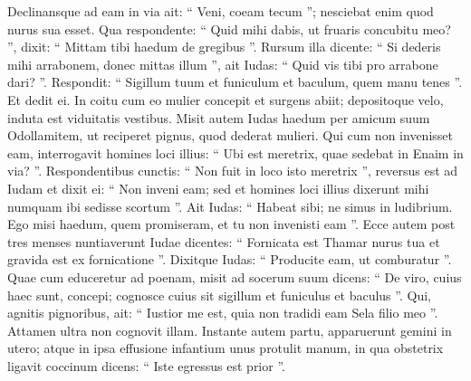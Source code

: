 \begin{biblechapter}
\begin{biblechapter}
\begin{biblechapter}
\begin{biblechapter}
\begin{biblechapter}
\begin{biblechapter}
\begin{biblechapter}
\begin{biblechapter}
\begin{biblechapter}
\begin{biblechapter}
\begin{biblechapter}
\begin{biblechapter}
\begin{biblechapter}
\begin{biblechapter}
\begin{biblechapter}
\begin{biblechapter}
\begin{biblechapter}
\begin{biblechapter}
\begin{biblechapter}
\begin{biblechapter}
\begin{biblechapter}
\begin{biblechapter}
\begin{biblechapter}
\begin{biblechapter}
\begin{biblechapter}
\begin{biblechapter}
\begin{biblechapter}
\begin{biblechapter}
\begin{biblechapter}
\begin{biblechapter}
\begin{biblechapter}
\begin{biblechapter}
\begin{biblechapter}
\begin{biblechapter}
\begin{biblechapter}
\begin{biblechapter}
\begin{biblechapter}
\begin{biblechapter}
\verse Declinansque ad eam in via ait: “ Veni, coeam tecum ”; nesciebat enim quod nurus sua esset. Qua respondente: “ Quid mihi dabis, ut fruaris concubitu meo? ”, 
\verse dixit: “ Mittam tibi haedum de gregibus ”. Rursum illa dicente: “ Si dederis mihi arrabonem, donec mittas illum ”, 
\verse ait Iudas: “ Quid vis tibi pro arrabone dari? ”. Respondit: “ Sigillum tuum et funiculum et baculum, quem manu tenes ”. Et dedit ei. In coitu cum eo mulier concepit 
\verse et surgens abiit; depositoque velo, induta est viduitatis vestibus.
 \verse Misit autem Iudas haedum per amicum suum Odollamitem, ut reciperet pignus, quod dederat mulieri. Qui cum non invenisset eam, 
\verse interrogavit homines loci illius: “ Ubi est meretrix, quae sedebat in Enaim in via? ”. Respondentibus cunctis: “ Non fuit in loco isto meretrix ”, 
\verse reversus est ad Iudam et dixit ei: “ Non inveni eam; sed et homines loci illius dixerunt mihi numquam ibi sedisse scortum ”. 
\verse Ait Iudas: “ Habeat sibi; ne simus in ludibrium. Ego misi haedum, quem promiseram, et tu non invenisti eam ”.
 \verse Ecce autem post tres menses nuntiaverunt Iudae dicentes: “ Fornicata est Thamar nurus tua et gravida est ex fornicatione ”. Dixitque Iudas: “ Producite eam, ut comburatur ”. 
\verse Quae cum educeretur ad poenam, misit ad socerum suum dicens: “ De viro, cuius haec sunt, concepi; cognosce cuius sit sigillum et funiculus et baculus ”. 
\verse Qui, agnitis pignoribus, ait: “ Iustior me est, quia non tradidi eam Sela filio meo ”. Attamen ultra non cognovit illam.
 \verse Instante autem partu, apparuerunt gemini in utero; atque in ipsa effusione infantium unus protulit manum, in qua obstetrix ligavit coccinum dicens: 
\verse “ Iste egressus est prior ”. 

\end{biblechapter}
\end{biblechapter}
\end{biblechapter}
\end{biblechapter}
\end{biblechapter}
\end{biblechapter}
\end{biblechapter}
\end{biblechapter}
\end{biblechapter}
\end{biblechapter}
\end{biblechapter}
\end{biblechapter}
\end{biblechapter}
\end{biblechapter}
\end{biblechapter}
\end{biblechapter}
\end{biblechapter}
\end{biblechapter}
\end{biblechapter}
\end{biblechapter}
\end{biblechapter}
\end{biblechapter}
\end{biblechapter}
\end{biblechapter}
\end{biblechapter}
\end{biblechapter}
\end{biblechapter}
\end{biblechapter}
\end{biblechapter}
\end{biblechapter}
\end{biblechapter}
\end{biblechapter}
\end{biblechapter}
\end{biblechapter}
\end{biblechapter}
\end{biblechapter}
\end{biblechapter}
\end{biblechapter}

